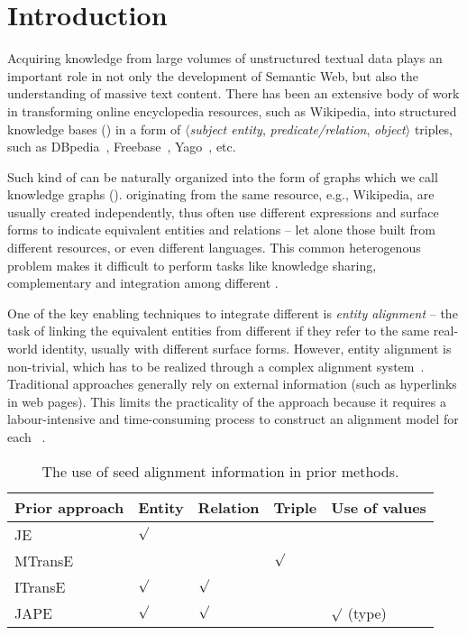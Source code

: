 	
	\section{Introduction}
	\label{section:intro}
    Acquiring knowledge from large volumes of unstructured textual data plays an important role in not only the development of Semantic
    Web, but also the understanding of massive text content. There has been an extensive body of work in transforming online encyclopedia resources, such as
    Wikipedia, into structured knowledge bases (\KBs) in a form of $\langle$\emph{subject entity},
   \emph{ predicate/relation}, \emph{object}$\rangle$ triples, such as DBpedia~\cite{Lehmann2009DBpedia,Auer2007DBpedia},
    Freebase~\cite{Bollacker2007Freebase}, Yago~\cite{Suchanek2008YAGO}, etc.
    	


	Such kind of \KBs can be naturally organized into the form of graphs which we call knowledge graphs (\KGs). \KGs originating from the
same resource, e.g., Wikipedia,  are usually created independently, thus often use different expressions and surface forms to indicate equivalent entities and
relations -- let alone those built from different resources, or even different languages. This common heterogenous problem makes it
difficult to perform tasks like knowledge sharing, complementary and integration among different \KGs.
	
	One of the key enabling techniques to integrate different \KGs is \emph{entity alignment} -- the task of linking the equivalent
entities from different \KGs if they refer to the same real-world identity, usually with different surface forms. However, entity alignment
is non-trivial, which  has to be realized through a complex alignment system~\cite{gokhale2014corleone,scharffe2014ontology}.
Traditional approaches generally rely on external information (such as hyperlinks in web pages). This limits the practicality of the
approach because it requires a labour-intensive and time-consuming process to construct an alignment model for each
\KG~\cite{zhu2017iterative}.


\begin{table}[t!]
	\centering
	\scriptsize
	\begin{tabular}{lllll}
		\toprule
		\bf Prior approach & \bf Entity & \bf Relation & \bf Triple & \bf Use of values \\
		\midrule
		\rowcolor{Gray} JE~\cite{hao2016joint} & ${\surd}$ & & & \\
		MTransE~\cite{chen2016multilingual} & $ $ & $ $ & ${\surd}$ & \\
		\rowcolor{Gray} ITransE~\cite{zhu2017iterative} & ${\surd}$ & ${\surd}$& & \\
		JAPE~\cite{sun2017cross} & ${\surd}$& ${\surd}$& & ${\surd}$ (type)\\
		\bottomrule
	\end{tabular}
	\caption{\small The use of seed alignment information in prior methods.}
	\label{seed}
\end{table}
	
